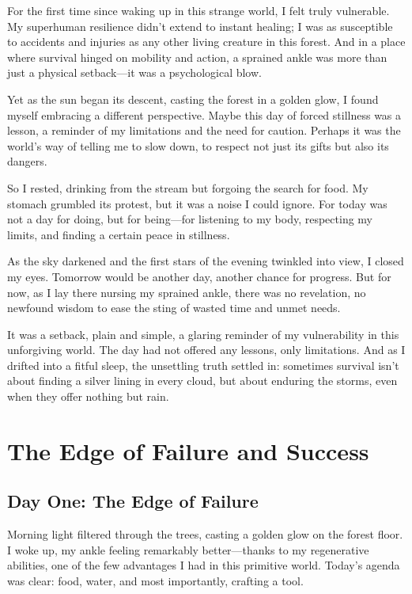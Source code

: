 \documentclass[]{article}
\begin{document}
For the first time since waking up in this strange world, I felt truly vulnerable. My superhuman resilience didn't extend to instant healing; I was as susceptible to accidents and injuries as any other living creature in this forest. And in a place where survival hinged on mobility and action, a sprained ankle was more than just a physical setback—it was a psychological blow.

Yet as the sun began its descent, casting the forest in a golden glow, I found myself embracing a different perspective. Maybe this day of forced stillness was a lesson, a reminder of my limitations and the need for caution. Perhaps it was the world's way of telling me to slow down, to respect not just its gifts but also its dangers.

So I rested, drinking from the stream but forgoing the search for food. My stomach grumbled its protest, but it was a noise I could ignore. For today was not a day for doing, but for being—for listening to my body, respecting my limits, and finding a certain peace in stillness.

As the sky darkened and the first stars of the evening twinkled into view, I closed my eyes. Tomorrow would be another day, another chance for progress. But for now, as I lay there nursing my sprained ankle, there was no revelation, no newfound wisdom to ease the sting of wasted time and unmet needs.

It was a setback, plain and simple, a glaring reminder of my vulnerability in this unforgiving world. The day had not offered any lessons, only limitations. And as I drifted into a fitful sleep, the unsettling truth settled in: sometimes survival isn't about finding a silver lining in every cloud, but about enduring the storms, even when they offer nothing but rain.


\section{The Edge of Failure and Success}
\subsection{Day One: The Edge of Failure}

Morning light filtered through the trees, casting a golden glow on the forest floor. I woke up, my ankle feeling remarkably better—thanks to my regenerative abilities, one of the few advantages I had in this primitive world. Today's agenda was clear: food, water, and most importantly, crafting a tool.
\end{document}
